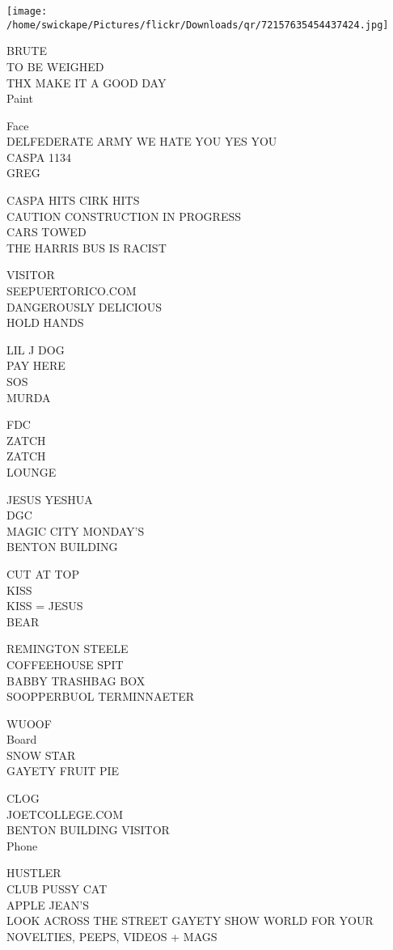 \documentclass[10pt,letterpaper]{article}
\begin{document}
\texttt{[image: /home/swickape/Pictures/flickr/Downloads/qr/72157635454437424.jpg]}


BRUTE\\
TO BE WEIGHED\\
THX MAKE IT A GOOD DAY\\
Paint

Face\\
DELFEDERATE ARMY WE HATE YOU YES YOU\\
CASPA 1134\\
GREG

CASPA HITS CIRK HITS\\
CAUTION CONSTRUCTION IN PROGRESS\\
CARS TOWED\\
THE HARRIS BUS IS RACIST

VISITOR\\
SEEPUERTORICO.COM\\
DANGEROUSLY DELICIOUS\\
HOLD HANDS

LIL J DOG\\
PAY HERE\\
SOS\\
MURDA

FDC\\
ZATCH\\
ZATCH\\
LOUNGE

JESUS YESHUA\\
DGC\\
MAGIC CITY MONDAY'S\\
BENTON BUILDING

CUT AT TOP\\
KISS\\
KISS = JESUS\\
BEAR

REMINGTON STEELE\\
COFFEEHOUSE SPIT\\
BABBY TRASHBAG BOX\\
SOOPPERBUOL TERMINNAETER

WUOOF\\
Board\\
SNOW STAR\\
GAYETY FRUIT PIE

CLOG\\
JOETCOLLEGE.COM\\
BENTON BUILDING VISITOR\\
Phone

HUSTLER\\
CLUB PUSSY CAT\\
APPLE JEAN'S\\
LOOK ACROSS THE STREET GAYETY SHOW WORLD FOR YOUR NOVELTIES, PEEPS, VIDEOS + MAGS
\end{document}
